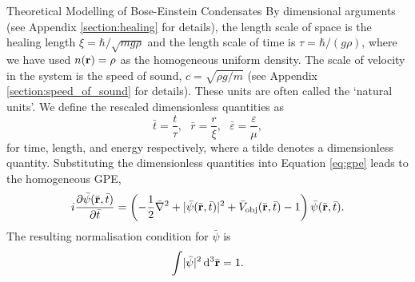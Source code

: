 \begin{chapter}{\label{cha:theoretical_model}Theoretical Modelling of Bose-Einstein Condensates}
		By dimensional arguments (see Appendix \ref{section:healing} for details), the length scale of space is the healing length $\xi = \hbar/\sqrt{mg\rho}$ and the length scale of time is $\tau = \hbar/(g\rho)$, where we have used $n({\bf r}) = \rho$ as the homogeneous uniform density. The scale of velocity in the system is the speed of sound, $c=\sqrt{\rho g/m}$ (see Appendix \ref{section:speed_of_sound} for details). These units are often called the `natural units'. We define the rescaled dimensionless quantities as
		\begin{equation}
			\bar{t} = \frac{t}{\tau}, ~~~ \bar{r} = \frac{r}{\xi}, ~~~ \bar{\varepsilon} = \frac{\varepsilon}{\mu},
		\end{equation}
		for time, length, and energy respectively, where a tilde denotes a dimensionless quantity. Substituting the dimensionless quantities into Equation \ref{eq:gpe} leads to the homogeneous GPE,
		\begin{equation}\label{eq:dimgpehomg}
		i\frac{\partial\bar{\psi}({\bar{\bf r}},\bar{t})}{\partial {\bar{t}}} = \left( -\frac{1}{2}\bar{\nabla}^2 + |\bar{\psi}({\bar{\bf r}},\bar{t})|^2 + \bar{V}_{\mathrm{obj}}({\bar{\bf r}},\bar{t}) - 1 \right) \bar{\psi}({\bar{\bf r}},\bar{t}).
		\end{equation}
		The resulting normalisation condition for $\bar{\psi}$ is
		\begin{equation}\label{eq:intwfhomg}
			\int \! |\bar{\psi}|^2 \, \mathrm{d}^3\bar{\bf r} = 1.
		\end{equation}


\end{chapter}
